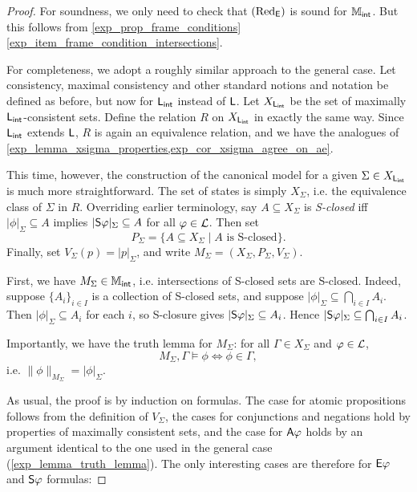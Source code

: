\begin{proof}
    For soundness, we only need to check that $\redE$ is sound for $\Mint$. But
    this follows from \cref{exp_prop_frame_conditions}
    \cref{exp_item_frame_condition_intersections}.

    For completeness, we adopt a roughly
    similar approach to the general case. Let consistency, maximal consistency and
    other standard notions and notation be defined as before, but now for $\sLint$
    instead of $\sL$. Let $X_{\sLint}$ be the set of maximally $\sLint$-consistent
    sets. Define the relation $R$ on $X_{\sLint}$ in exactly the same way. Since
    $\sLint$ extends $\sL$, $R$ is again an equivalence relation, and we have the
    analogues of \cref{exp_lemma_xsigma_properties,exp_cor_xsigma_agree_on_ae}.

    This time, however, the construction of the canonical model for a given
    $\Sigma \in X_{\sLint}$ is much more straightforward. The set of
    states is simply $X_\Sigma$, i.e. the equivalence class of
    $\Sigma$ in $R$. Overriding earlier terminology, say $A
    \subseteq X_\Sigma$ is \emph{S-closed} iff $|\phi|_\Sigma \subseteq A$
    implies $|\S\phi|_\Sigma \subseteq A$ for all $\phi \in \cL$.
    Then set
    \[
        P_\Sigma = \{A \subseteq X_\Sigma \mid A \text{ is S-closed}\}.
    \]
    Finally, set $V_\Sigma(p) = |p|_\Sigma$, and write $M_\Sigma
    = (X_\Sigma, P_\Sigma, V_\Sigma)$.

    First, we have $M_\Sigma \in \Mint$, i.e. intersections of S-closed sets are
    S-closed.  Indeed, suppose $\{A_i\}_{i \in I}$ is a collection of S-closed
    sets, and suppose $|\phi|_\Sigma \subseteq \bigcap_{i \in I}{A_i}$. Then
    $|\phi|_\Sigma \subseteq A_i$ for each $i$, so S-closure gives $|\S\phi|_\Sigma
    \subseteq A_i$.  Hence $|\S\phi|_\Sigma \subseteq \bigcap_{i \in I}{A_i}$.

    Importantly, we have the truth lemma for $M_\Sigma$: for all $\Gamma \in
        X_\Sigma$ and $\phi \in \cL$,
    \[
        M_\Sigma, \Gamma \models \phi \iff \phi \in \Gamma,
    \]
    i.e. $\|\phi\|_{M_\Sigma} = |\phi|_\Sigma$.

    As usual, the proof is by induction on formulas. The case for atomic
    propositions follows from the definition of $V_\Sigma$, the cases for
    conjunctions and negations hold by properties of maximally consistent sets,
    and the case for $\A\phi$ holds by an argument identical to the one used in
    the general case (\cref{exp_lemma_truth_lemma}). The only interesting cases are
    therefore for $\E\phi$ and $\S\phi$ formulas:


\end{proof}
